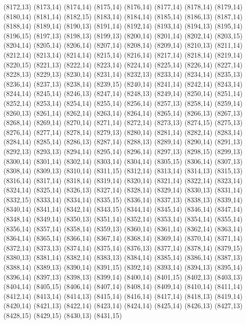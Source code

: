 (8172,13)
(8173,14)
(8174,14)
(8175,14)
(8176,14)
(8177,14)
(8178,14)
(8179,14)
(8180,14)
(8181,14)
(8182,15)
(8183,14)
(8184,14)
(8185,14)
(8186,13)
(8187,14)
(8188,14)
(8189,14)
(8190,13)
(8191,14)
(8192,14)
(8193,14)
(8194,13)
(8195,14)
(8196,15)
(8197,13)
(8198,13)
(8199,13)
(8200,14)
(8201,14)
(8202,14)
(8203,15)
(8204,14)
(8205,14)
(8206,14)
(8207,14)
(8208,14)
(8209,14)
(8210,13)
(8211,14)
(8212,14)
(8213,14)
(8214,14)
(8215,14)
(8216,14)
(8217,14)
(8218,14)
(8219,14)
(8220,15)
(8221,13)
(8222,14)
(8223,14)
(8224,14)
(8225,14)
(8226,14)
(8227,14)
(8228,13)
(8229,13)
(8230,14)
(8231,14)
(8232,13)
(8233,14)
(8234,14)
(8235,13)
(8236,14)
(8237,13)
(8238,14)
(8239,15)
(8240,14)
(8241,14)
(8242,14)
(8243,14)
(8244,14)
(8245,14)
(8246,13)
(8247,14)
(8248,13)
(8249,14)
(8250,14)
(8251,14)
(8252,14)
(8253,14)
(8254,14)
(8255,14)
(8256,14)
(8257,13)
(8258,14)
(8259,14)
(8260,13)
(8261,14)
(8262,14)
(8263,14)
(8264,14)
(8265,14)
(8266,13)
(8267,13)
(8268,14)
(8269,14)
(8270,14)
(8271,14)
(8272,14)
(8273,13)
(8274,15)
(8275,13)
(8276,14)
(8277,14)
(8278,14)
(8279,13)
(8280,14)
(8281,14)
(8282,14)
(8283,14)
(8284,14)
(8285,14)
(8286,13)
(8287,14)
(8288,13)
(8289,14)
(8290,14)
(8291,13)
(8292,13)
(8293,13)
(8294,14)
(8295,14)
(8296,14)
(8297,13)
(8298,15)
(8299,13)
(8300,14)
(8301,14)
(8302,14)
(8303,14)
(8304,14)
(8305,15)
(8306,14)
(8307,13)
(8308,14)
(8309,13)
(8310,14)
(8311,15)
(8312,14)
(8313,14)
(8314,13)
(8315,13)
(8316,14)
(8317,14)
(8318,14)
(8319,14)
(8320,14)
(8321,14)
(8322,14)
(8323,14)
(8324,14)
(8325,14)
(8326,13)
(8327,14)
(8328,14)
(8329,14)
(8330,13)
(8331,14)
(8332,15)
(8333,14)
(8334,14)
(8335,15)
(8336,14)
(8337,13)
(8338,13)
(8339,14)
(8340,14)
(8341,14)
(8342,14)
(8343,15)
(8344,14)
(8345,14)
(8346,14)
(8347,14)
(8348,14)
(8349,14)
(8350,13)
(8351,14)
(8352,14)
(8353,14)
(8354,14)
(8355,14)
(8356,14)
(8357,14)
(8358,14)
(8359,13)
(8360,14)
(8361,14)
(8362,14)
(8363,14)
(8364,14)
(8365,14)
(8366,14)
(8367,14)
(8368,14)
(8369,14)
(8370,14)
(8371,14)
(8372,14)
(8373,13)
(8374,14)
(8375,14)
(8376,13)
(8377,14)
(8378,14)
(8379,15)
(8380,13)
(8381,14)
(8382,14)
(8383,13)
(8384,14)
(8385,14)
(8386,14)
(8387,13)
(8388,14)
(8389,13)
(8390,14)
(8391,15)
(8392,14)
(8393,14)
(8394,13)
(8395,14)
(8396,14)
(8397,13)
(8398,13)
(8399,14)
(8400,14)
(8401,15)
(8402,13)
(8403,13)
(8404,14)
(8405,15)
(8406,14)
(8407,14)
(8408,14)
(8409,14)
(8410,14)
(8411,14)
(8412,14)
(8413,14)
(8414,13)
(8415,14)
(8416,14)
(8417,14)
(8418,13)
(8419,14)
(8420,14)
(8421,13)
(8422,14)
(8423,14)
(8424,14)
(8425,14)
(8426,13)
(8427,13)
(8428,15)
(8429,15)
(8430,13)
(8431,15)
